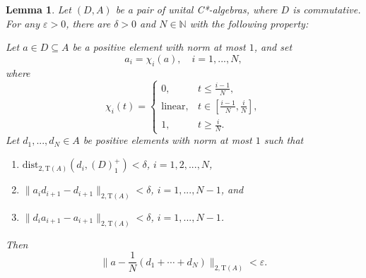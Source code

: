 \documentclass[12pt, oneside, psamsfonts]{amsart}
\newtheorem{lem}[thm]{Lemma}
\theoremstyle{definition}
\theoremstyle{remark}
\numberwithin{equation}{section}
\newcommand{\norm}[1]{\| #1\|}
\newcommand{\eps}{\varepsilon}
\newcommand{\tr}{\mathrm{T}}
\begin{document}
\begin{lem}\label{hereditary-sets-tr-app}
Let $(D, A)$ be a pair of unital C*-algebras, where $D$ is commutative. For any $\eps>0$, there are $\delta>0$ and $N \in \mathbb N$ with the following property:  

Let $a \in D \subseteq A$ be a positive element with norm at most $1$, and set $$a_i = \chi_i(a),\quad  i=1, ..., N, $$ where $$\chi_i(t) = \left\{ 
\begin{array}{ll}
0, & t \leq \frac{i-1}{N}, \\
\mathrm{linear}, & t \in [\frac{i-1}{N}, \frac{i}{N}], \\
1, & t \geq \frac{i}{N}.
\end{array} 
\right.
$$
Let $d_1, ..., d_N \in A$ be positive elements with norm at most $1$ such that
         \begin{enumerate}
         \item $\mathrm{dist}_{2, \tr(A)}(d_i, (D)^+_1) < \delta$, $i=1, 2, ..., N$,
         \item\label{here-cond-1-a-tr} $ \norm{a_{i} d_{i+1} - d_{i+1}}_{2, \tr(A)} < \delta$, $i=1, ..., N-1$, and 
         \item\label{here-cond-1-b-tr} $ \norm{d_i a_{i+1} - a_{i+1}}_{2, \tr(A)} < \delta$, $i=1, ..., N-1$.
         \end{enumerate} 
        Then
        $$\norm{ a  - \frac{1}{N}(d_1 + \cdots + d_N)}_{2, \tr(A)} < \eps.$$
\end{lem}
\end{document}
